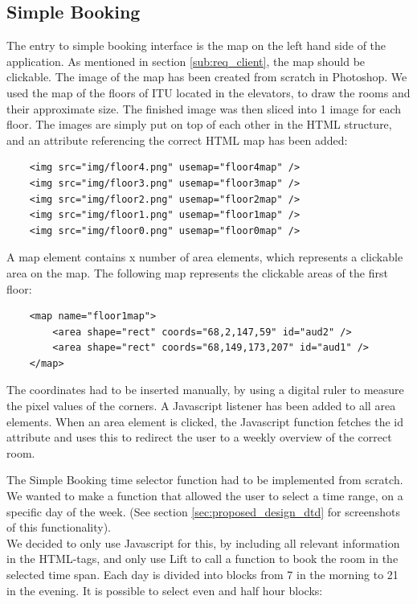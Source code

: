 \subsection{Simple Booking}
The entry to simple booking interface is the map on the left hand side of the application. As mentioned in section \ref{sub:req_client}, the map should be clickable. The image of the map has been created from scratch in Photoshop. We used the map of the floors of ITU located in the elevators, to draw the rooms and their approximate size. The finished image was then sliced into 1 image for each floor. The images are simply put on top of each other in the HTML structure, and an attribute referencing the correct HTML map has been added:

\begin{verbatim}
	<img src="img/floor4.png" usemap="floor4map" />
	<img src="img/floor3.png" usemap="floor3map" />
	<img src="img/floor2.png" usemap="floor2map" />
	<img src="img/floor1.png" usemap="floor1map" />
	<img src="img/floor0.png" usemap="floor0map" />
\end{verbatim}

A map element contains x number of area elements, which represents a clickable area on the map. The following map represents the clickable areas of the first floor:

\begin{verbatim}
	<map name="floor1map">
		<area shape="rect" coords="68,2,147,59" id="aud2" />
		<area shape="rect" coords="68,149,173,207" id="aud1" />
	</map>
\end{verbatim}

The coordinates had to be inserted manually, by using a digital ruler to measure the pixel values of the corners. A Javascript listener has been added to all area elements. When an area element is clicked, the Javascript function fetches the id attribute and uses this to redirect the user to a weekly overview of the correct room.

The Simple Booking time selector function had to be implemented from scratch. We wanted to make a function that allowed the user to select a time range, on a specific day of the week. (See section \ref{sec:proposed_design_dtd} for screenshots of this functionality). \\
We decided to only use Javascript for this, by including all relevant information in the HTML-tags, and only use Lift to call a function to book the room in the selected time span. Each day is divided into blocks from 7 in the morning to 21 in the evening. It is possible to select even and half hour blocks:

